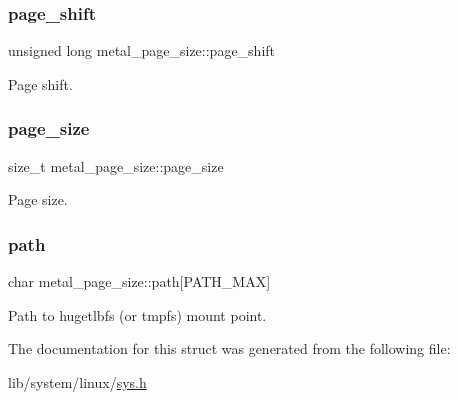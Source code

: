 \subsubsection{\texorpdfstring{page\+\_\+shift}{page\_shift}}
{\footnotesize\ttfamily unsigned long metal\+\_\+page\+\_\+size\+::page\+\_\+shift}

Page shift. \mbox{\label{structmetal__page__size_a97c5f203beaedb46b0d52425e5445a08}} 
\subsubsection{\texorpdfstring{page\+\_\+size}{page\_size}}
{\footnotesize\ttfamily size\+\_\+t metal\+\_\+page\+\_\+size\+::page\+\_\+size}

Page size. \mbox{\label{structmetal__page__size_aea1125ee871f2ddaca6580fc78985113}} 
\subsubsection{\texorpdfstring{path}{path}}
{\footnotesize\ttfamily char metal\+\_\+page\+\_\+size\+::path\mbox{[}P\+A\+T\+H\+\_\+\+M\+AX\mbox{]}}

Path to hugetlbfs (or tmpfs) mount point. 

The documentation for this struct was generated from the following file\+:\begin{DoxyCompactItemize}
\item 
lib/system/linux/\hyperlink{system_2linux_2sys_8h}{sys.\+h}\end{DoxyCompactItemize}
